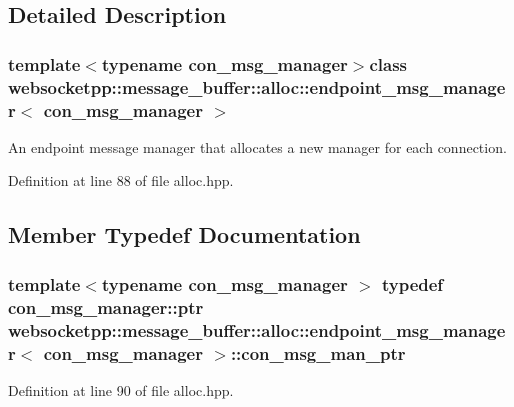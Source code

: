 \subsection{Detailed Description}
\subsubsection*{template$<$typename con\+\_\+msg\+\_\+manager$>$class websocketpp\+::message\+\_\+buffer\+::alloc\+::endpoint\+\_\+msg\+\_\+manager$<$ con\+\_\+msg\+\_\+manager $>$}

An endpoint message manager that allocates a new manager for each connection. 

Definition at line 88 of file alloc.\+hpp.



\subsection{Member Typedef Documentation}
\hypertarget{classwebsocketpp_1_1message__buffer_1_1alloc_1_1endpoint__msg__manager_aa850684cf613468b4c6bb1497dcb2f52}{}
\subsubsection[{con\+\_\+msg\+\_\+man\+\_\+ptr}]{\setlength{\rightskip}{0pt plus 5cm}template$<$typename con\+\_\+msg\+\_\+manager $>$ typedef {\bf con\+\_\+msg\+\_\+manager\+::ptr} {\bf websocketpp\+::message\+\_\+buffer\+::alloc\+::endpoint\+\_\+msg\+\_\+manager}$<$ {\bf con\+\_\+msg\+\_\+manager} $>$\+::{\bf con\+\_\+msg\+\_\+man\+\_\+ptr}}\label{classwebsocketpp_1_1message__buffer_1_1alloc_1_1endpoint__msg__manager_aa850684cf613468b4c6bb1497dcb2f52}


Definition at line 90 of file alloc.\+hpp.

\hypertarget{classwebsocketpp_1_1message__buffer_1_1alloc_1_1endpoint__msg__manager_aa850684cf613468b4c6bb1497dcb2f52}{}
